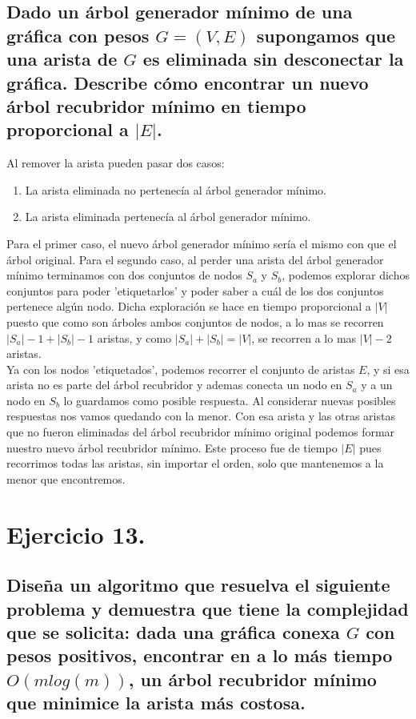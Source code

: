 \documentclass[12pt]{article}
\begin{document}
\subsection{Dado un árbol generador mínimo de una gráfica con pesos $G=(V,E)$ supongamos que una arista de $G$ es eliminada sin desconectar la gráfica. Describe cómo encontrar un nuevo árbol recubridor mínimo en tiempo proporcional a $|E|$.}
Al remover la arista pueden pasar dos casos:
\begin{enumerate}
\item La arista eliminada no pertenecía al árbol generador mínimo.
\item La arista eliminada pertenecía al árbol generador mínimo.
\end{enumerate}
Para el primer caso, el nuevo árbol generador mínimo sería el mismo con que el árbol original.
Para el segundo caso, al perder una arista del árbol generador mínimo terminamos con dos conjuntos de nodos $S_a$ y $S_b$, podemos explorar dichos conjuntos para poder 'etiquetarlos' y poder saber a cuál de los dos conjuntos pertenece algún nodo. Dicha exploración se hace en tiempo proporcional a $|V|$ puesto que como son árboles ambos conjuntos de nodos, a lo mas se recorren $|S_a|-1 + |S_b|-1$ aristas, y como $|S_a| + |S_b| = |V|$, se recorren a lo mas $|V|-2$ aristas.\\ 
Ya con los nodos 'etiquetados', podemos recorrer el conjunto de aristas $E$, y si esa arista no es parte del árbol recubridor y ademas conecta un nodo en $S_a$ y a un nodo en $S_b$ lo guardamos como posible respuesta. Al considerar nuevas posibles respuestas nos vamos quedando con la menor. Con esa arista y las otras aristas que no fueron eliminadas del árbol recubridor mínimo original podemos formar nuestro nuevo árbol recubridor mínimo. Este proceso fue de tiempo $|E|$ pues recorrimos todas las aristas, sin importar el orden, solo que mantenemos a la menor que encontremos.
\section{Ejercicio 13.}
\subsection{Diseña un algoritmo que resuelva el siguiente problema y demuestra que tiene la complejidad que se solicita: dada una gráfica conexa $G$ con pesos positivos, encontrar en a lo más tiempo $O(mlog(m))$, un árbol recubridor mínimo que minimice la arista más costosa.}
\end{document}
